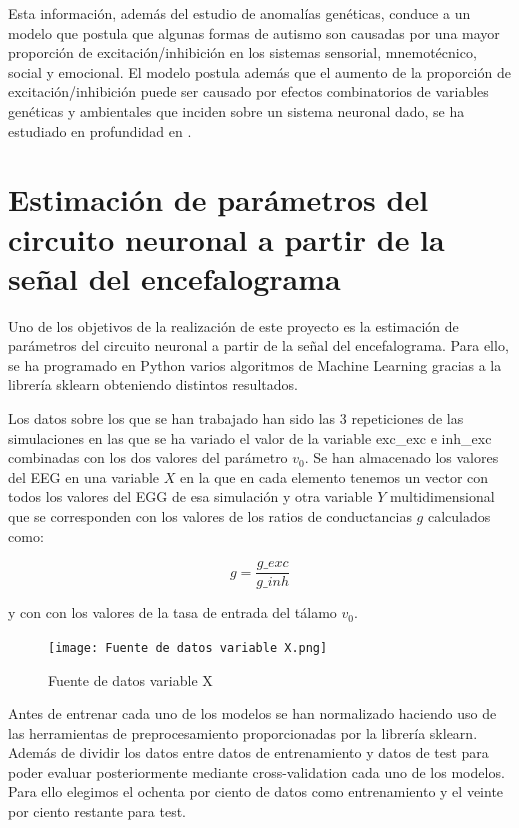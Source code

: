 \documentclass[oneside,openright,titlepage,numbers=noenddot,openany,headinclude,footinclude=true,
cleardoublepage=empty,abstractoff,BCOR=5mm,paper=a4,fontsize=12pt,main=spanish]{scrreprt}
\begin{document}
Esta información, además del estudio de anomalías genéticas, conduce a un modelo que postula que algunas formas de autismo son causadas por una mayor proporción de excitación/inhibición en los sistemas sensorial, mnemotécnico, social y emocional. El modelo postula además que el aumento de la proporción de excitación/inhibición puede ser causado por efectos combinatorios de variables genéticas y ambientales que inciden sobre un sistema neuronal dado, se ha estudiado en profundidad en \cite{modelofautism}.

\newpage
\chapter{Estimación de parámetros del circuito neuronal a partir de la señal del encefalograma}\label{part:estimaciones}

Uno de los objetivos de la realización de este proyecto es la estimación de parámetros del circuito neuronal a partir de la señal del encefalograma. Para ello, se ha programado en Python varios algoritmos de Machine Learning gracias a la librería sklearn obteniendo distintos resultados.

Los datos sobre los que se han trabajado han sido las 3 repeticiones de las simulaciones en las que se ha variado el valor de la variable exc\_exc e inh\_exc combinadas con los dos valores del parámetro $v_{0}$. Se han almacenado los valores del EEG en una variable $X$ en la que en cada elemento tenemos un vector con todos los valores del EGG de esa simulación y otra variable $Y$ multidimensional que se corresponden con los valores de los ratios de conductancias $g$ calculados como:

\begin{equation}
    g = \frac{g\_exc}{g\_inh}
\end{equation}

y con con los valores de la tasa de entrada del tálamo $v_0$.

\begin{figure}[H]
	\centering
	\texttt{[image: Fuente de datos variable X.png]}
	\caption{Fuente de datos variable X}
\end{figure}

Antes de entrenar cada uno de los modelos se han normalizado haciendo uso de las herramientas de preprocesamiento proporcionadas por la librería sklearn. Además de dividir los datos entre datos de entrenamiento y datos de test para poder evaluar posteriormente mediante cross-validation cada uno de los modelos. Para ello elegimos el ochenta por ciento de datos como entrenamiento y el veinte por ciento restante para test.
\end{document}
